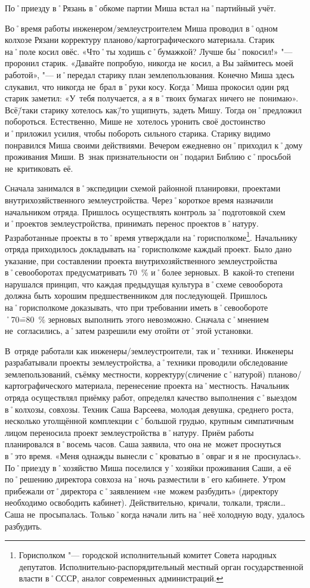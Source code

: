 По˚приезду в˚Рязань в˚обкоме партии Миша встал на˚партийный учёт.

Во˚время работы инженером\-/землеустроителем Миша проводил в˚одном колхозе Рязани корректуру планово\-/картографического материала. Старик на˚поле косил овёс. «Что˚ты ходишь с˚бумажкой? Лучше бы˚покосил!» "--- проронил старик. «Давайте попробую, никогда не~косил, а Вы займитесь моей работой», "--- и˚передал старику план землепользования. Конечно Миша здесь слукавил, что никогда не~брал в˚руки косу. Когда˚Миша прокосил один ряд старик заметил: «У~тебя получается, а я в˚твоих бумагах ничего не~понимаю». Всё\=/таки старику хотелось как\=/то ущипнуть, задеть Мишу. Тогда он˚предложил побороться. Естественно, Мише не~хотелось уронить своё достоинство и˚приложил усилия, чтобы побороть сильного старика. Старику видимо понравился Миша своими действиями. Вечером ежедневно он˚приходил к˚дому проживания Миши. В~знак признательности он˚подарил Библию с˚просьбой не~критиковать её.

Сначала занимался в˚экспедиции схемой районной планировки, проектами внутрихозяйственного землеустройства. Через˚короткое время назначили начальником отряда. Пришлось осуществлять контроль за˚подготовкой схем и˚проектов землеустройства, принимать перенос проектов в˚натуру. Разработанные проекты в то˚время утверждали на˚горисполкоме\footnote{Горисполком "--- городской исполнительный комитет Совета народных депутатов. Исполнительно-распорядительный местный орган государственной власти в˚СССР, аналог современных администраций.}. Начальнику отряда приходилось докладывать на˚горисполкоме каждый проект. Было дано указание, при составлении проекта внутрихозяйственного землеустройства в˚севооборотах предусматривать 70~\% и˚более зерновых. В~какой-то степени нарушался принцип, что каждая предыдущая культура в˚схеме севооборота должна быть хорошим предшественником для последующей. Пришлось на˚горисполкоме доказывать, что при требовании иметь в˚севообороте ˚70\==80~\% зерновых выполнить этого невозможно. Сначала с˚мнением не~согласились, а˚затем разрешили ему отойти от˚этой установки.

В~отряде работали как инженеры\-/землеустроители, так и˚техники. Инженеры разрабатывали проекты землеустройства, а˚техники проводили обследование землепользований, съёмку местности, корректуру(сличение с˚натурой) планово\-/картографического материала, перенесение проекта на˚местность. Начальник отряда осуществлял приёмку работ, определял качество выполнения с˚выездом в˚колхозы, совхозы. Техник Саша Варсеева, молодая девушка, среднего роста, несколько утолщённой комплекции с˚большой грудью, крупным симпатичным лицом переносила проект землеустройства в˚натуру. Приём работы планировался в˚восемь часов. Саша заявила, что она не~может проснуться в˚это время. «Меня однажды вынесли с˚кроватью в˚овраг и я не~проснулась». По˚приезду в˚хозяйство Миша поселился у˚хозяйки проживания Саши, а её по˚решению директора совхоза на˚ночь разместили в˚его кабинете. Утром прибежали от˚директора с˚заявлением «не~можем разбудить» (директору необходимо освободить кабинет). Действительно, кричали, толкали, трясли… Саша не~просыпалась. Только˚когда начали лить на˚неё холодную воду, удалось разбудить.

